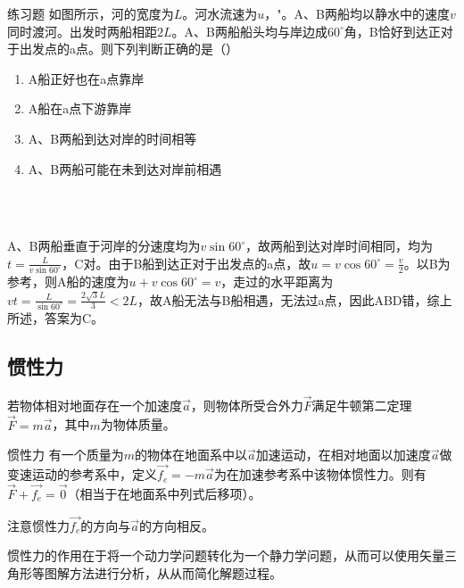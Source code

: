 \begin{ep}{练习题}{}
如图所示，河的宽度为$L$。河水流速为$u$，"。A、B两船均以静水中的速度$v$同时渡河。出发时两船相距$2L$。A、B两船船头均与岸边成$60^{\circ}$角，B恰好到达正对于出发点的a点。则下列判断正确的是（）

\begin{minipage}[b]{0.65\linewidth}
\begin{enumerate}[label=(\Alph*)]
  \item A船正好也在a点靠岸
  \item A船在a点下游靠岸
  \item A、B两船到达对岸的时间相等
  \item A、B两船可能在未到达对岸前相遇
\end{enumerate}
\end{minipage}
\hfill
\begin{minipage}[b]{0.3\linewidth}

~\\
\end{minipage}
~\\

A、B两船垂直于河岸的分速度均为$v \sin 60^{\circ}$，故两船到达对岸时间相同，均为$t=\frac{L}{v \sin 60^{\circ}}$，C对。由于B船到达正对于出发点的a点，故$u = v \cos 60^{\circ} = \frac{v}{2}$。以B为参考，则A船的速度为$u + v \cos 60^{\circ} = v$，走过的水平距离为$v t = \frac{L}{\sin 60^{\circ}} = \frac{2 \sqrt{3} L}{3} < 2L$，故A船无法与B船相遇，无法过a点，因此ABD错，综上所述，答案为C。
\end{ep}

\subsection{惯性力}
\label{s_gxl}

若物体相对地面存在一个加速度$\vec{a}$，则物体所受合外力$\vec{F}$满足牛顿第二定理$\vec{F}=m \vec{a}$，其中$m$为物体质量。

\begin{defi}{惯性力}{}
有一个质量为$m$的物体在地面系中以$\vec{a}$加速运动，在相对地面以加速度$\vec{a}$做变速运动的参考系中，定义$\vec{f_e}=-m \vec{a}$为在加速参考系中该物体惯性力。则有$\vec{F}+\vec{f_e} = \vec{0}$（相当于在地面系中列式后移项）。

注意惯性力$\vec{f_e}$的方向与$\vec{a}$的方向相反。
\end{defi}

惯性力的作用在于将一个动力学问题转化为一个静力学问题，从而可以使用矢量三角形等图解方法进行分析，从从而简化解题过程。

